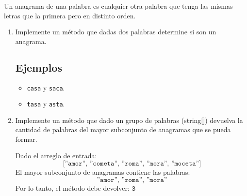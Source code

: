 Un anagrama de una palabra es cualquier otra palabra que tenga las mismas letras que la primera pero en distinto orden.

\begin{enumerate}
    \item Implemente un método que dadas dos palabras determine si son un anagrama.

    \subsection*{Ejemplos}
    \begin{itemize}
    \item \texttt{casa} y \texttt{saca}.
    \item \texttt{tasa} y \texttt{asta}.
    \end{itemize}

    \item Implemente un método que dado un grupo de palabras (string[]) devuelva la cantidad de palabras del mayor subconjunto de anagramas que se pueda formar.

    Dado el arreglo de entrada:
    \[
    \texttt{[''amor'', ''cometa'', ''roma'', ''mora'', ''moceta'']}
    \]
    El mayor subconjunto de anagramas contiene las palabras:
    \[
    \texttt{''amor'', ''roma'', ''mora''}
    \]
    Por lo tanto, el método debe devolver: \( \texttt{3} \)
\end{enumerate}